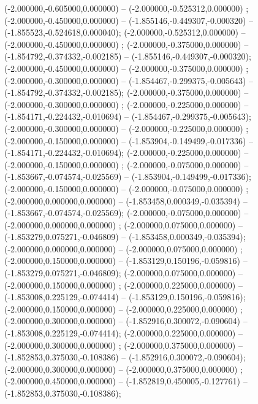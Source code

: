  (-2.000000,-0.605000,0.000000) -- (-2.000000,-0.525312,0.000000) ;
 (-2.000000,-0.450000,0.000000) -- (-1.855146,-0.449307,-0.000320) -- (-1.855523,-0.524618,0.000040);
 (-2.000000,-0.525312,0.000000) -- (-2.000000,-0.450000,0.000000) ;
 (-2.000000,-0.375000,0.000000) -- (-1.854792,-0.374332,-0.002185) -- (-1.855146,-0.449307,-0.000320);
 (-2.000000,-0.450000,0.000000) -- (-2.000000,-0.375000,0.000000) ;
 (-2.000000,-0.300000,0.000000) -- (-1.854467,-0.299375,-0.005643) -- (-1.854792,-0.374332,-0.002185);
 (-2.000000,-0.375000,0.000000) -- (-2.000000,-0.300000,0.000000) ;
 (-2.000000,-0.225000,0.000000) -- (-1.854171,-0.224432,-0.010694) -- (-1.854467,-0.299375,-0.005643);
 (-2.000000,-0.300000,0.000000) -- (-2.000000,-0.225000,0.000000) ;
 (-2.000000,-0.150000,0.000000) -- (-1.853904,-0.149499,-0.017336) -- (-1.854171,-0.224432,-0.010694);
 (-2.000000,-0.225000,0.000000) -- (-2.000000,-0.150000,0.000000) ;
 (-2.000000,-0.075000,0.000000) -- (-1.853667,-0.074574,-0.025569) -- (-1.853904,-0.149499,-0.017336);
 (-2.000000,-0.150000,0.000000) -- (-2.000000,-0.075000,0.000000) ;
 (-2.000000,0.000000,0.000000) -- (-1.853458,0.000349,-0.035394) -- (-1.853667,-0.074574,-0.025569);
 (-2.000000,-0.075000,0.000000) -- (-2.000000,0.000000,0.000000) ;
 (-2.000000,0.075000,0.000000) -- (-1.853279,0.075271,-0.046809) -- (-1.853458,0.000349,-0.035394);
 (-2.000000,0.000000,0.000000) -- (-2.000000,0.075000,0.000000) ;
 (-2.000000,0.150000,0.000000) -- (-1.853129,0.150196,-0.059816) -- (-1.853279,0.075271,-0.046809);
 (-2.000000,0.075000,0.000000) -- (-2.000000,0.150000,0.000000) ;
 (-2.000000,0.225000,0.000000) -- (-1.853008,0.225129,-0.074414) -- (-1.853129,0.150196,-0.059816);
 (-2.000000,0.150000,0.000000) -- (-2.000000,0.225000,0.000000) ;
 (-2.000000,0.300000,0.000000) -- (-1.852916,0.300072,-0.090604) -- (-1.853008,0.225129,-0.074414);
 (-2.000000,0.225000,0.000000) -- (-2.000000,0.300000,0.000000) ;
 (-2.000000,0.375000,0.000000) -- (-1.852853,0.375030,-0.108386) -- (-1.852916,0.300072,-0.090604);
 (-2.000000,0.300000,0.000000) -- (-2.000000,0.375000,0.000000) ;
 (-2.000000,0.450000,0.000000) -- (-1.852819,0.450005,-0.127761) -- (-1.852853,0.375030,-0.108386);

